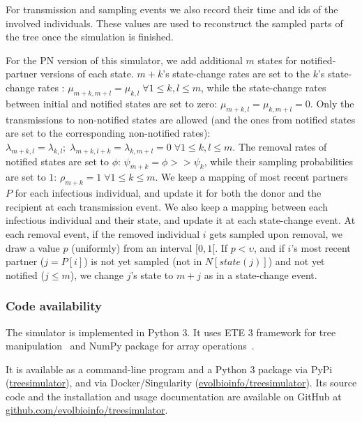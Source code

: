 \documentclass[10pt,letterpaper]{article}
\begin{document}
For transmission and sampling events we also record their time and ids of the involved individuals. These values are used to reconstruct the sampled parts of the tree once the simulation is finished.

\smallskip

For the PN version of this simulator, we add additional $m$ states for notified-partner versions of each state. $m + k$'s state-change rates are set to the $k$'s state-change rates : $\mu_{m+k,m+l} = \mu_{k,l}\; \forall 1 \leq  k,l \leq m$, while the state-change rates between initial and notified states are set to zero: $\mu_{m+k,l} = \mu_{k,m+l} = 0$. Only the transmissions to non-notified states are allowed (and the ones from notified states are set to the corresponding non-notified rates): $\lambda_{m+k,l} = \lambda_{k,l}; \;\lambda_{m+k,l+k} = \lambda_{k,m+l} =0 \; \forall 1 \leq  k,l \leq m$. The removal rates of notified states are set to $\phi$: $\psi_{m+k} = \phi >> \psi_k$, while their sampling probabilities are set to $1$: $\rho_{m+k} = 1 \; \forall 1 \leq  k \leq m$. We keep a mapping of most recent partners $P$ for each infectious individual, and update it for both the donor and the recipient at each transmission event. We also keep a mapping between each infectious individual and their state, and update it at each state-change event. At each removal event, if the removed individual $i$ gets sampled upon removal, we draw a value $p$ (uniformly) from an interval $[0, 1[$. If $p < \upsilon$, and if $i$'s most recent partner ($j = P[i]$) is not yet sampled (not in $N[state(j)]$) and not yet notified ($j \leq m$), we change $j$'s state to $m + j$ as in a state-change event.

\subsubsection*{Code availability}
The simulator is implemented in Python 3. It uses ETE 3 framework for tree manipulation~\cite{Huerta-Cepas2016} and NumPy package for array operations~\cite{harris_array_2020}. 

It is available as a command-line program and a Python 3 package via PyPi (\href{https://pypi.org/project/treesimulator}{treesimulator}), and via Docker/Singularity (\href{https://hub.docker.com/r/evolbioinfo/treesimulator/tags}{evolbioinfo/treesimulator}). Its source code and the installation and usage documentation are available on GitHub at \href{https://github.com/evolbioinfo/treesimulator}{github.com/evolbioinfo/treesimulator}.
\end{document}

